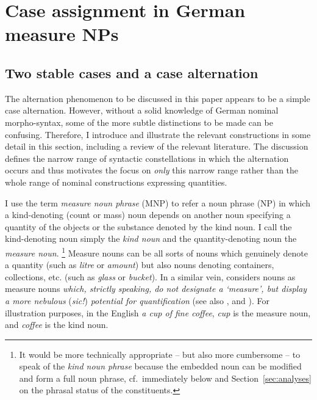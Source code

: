 \documentclass[USenglish]{article}
\begin{document}

\section{Case assignment in German measure NPs}
\label{sec:germanmeasurenps}

\subsection{Two stable cases and a case alternation}
\label{sec:descriptive}

The alternation phenomenon to be discussed in this paper appears to be a simple case alternation.
However, without a solid knowledge of German nominal morpho-syntax, some of the more subtle distinctions to be made can be confusing.
Therefore, I introduce and illustrate the relevant constructions in some detail in this section, including a review of the relevant literature.
The discussion defines the narrow range of syntactic constellations in which the alternation occurs and thus motivates the focus on \textit{only} this narrow range rather than the whole range of nominal constructions expressing quantities.

I use the term \textit{measure noun phrase} (MNP) to refer a noun phrase (NP) in which a kind-denoting (count or mass) noun depends on another noun specifying a quantity of the objects or the substance denoted by the kind noun.
I call the kind-denoting noun simply the \textit{kind noun} and the quantity-denoting noun the \textit{measure noun}.%
\footnote{It would be more technically appropriate -- but also more cumbersome -- to speak of the \textit{kind noun phrase} because the embedded noun can be modified and form a full noun phrase, cf.\ immediately below and Section~\ref{sec:analyses} on the phrasal status of the constituents.}
Measure nouns can be all sorts of nouns which genuinely denote a quantity (such as \textit{litre} or \textit{amount}) but also nouns denoting containers, collections, etc. (such as \textit{glass} or \textit{bucket}).
In a similar vein, \cite[284]{Brems2003} considers nouns as measure nouns \textit{which, strictly speaking, do not designate a `measure', but display a more nebulous} (\textit{sic!}) \textit{potential for quantification} (see also \citealp[530]{Koptjevskaja2001}, and \citealp[338]{Rutkowski2007}).
For illustration purposes, in the English \textit{a cup of fine coffee}, \textit{cup} is the measure noun, and \textit{coffee} is the kind noun.
\end{document}
